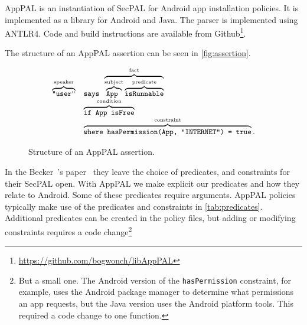 \documentclass[]{llncs}
\begin{document}
AppPAL is an instantiation of SecPAL for Android app installation policies.
It is implemented as a library for Android and Java.
The parser is implemented using ANTLR4.
Code and build instructions are available from Github\footnote{\url{https://github.com/bogwonch/libAppPAL}}.

The structure of an AppPAL assertion can be seen in \autoref{fig:assertion}.

\begin{figure}
  \centering
  \begin{equation*}\small
    \begin{array}{r l}
      \overbrace{\text{\ttfamily "user"}}^{\text{speaker}} &
      \text{\ttfamily says }\overbrace{\overbrace{\text{\ttfamily App }}^{\text{subject}}\overbrace{\text{\ttfamily isRunnable}}^{\text{predicate}}}^{\text{fact}} \\
      & \overbrace{\text{\ttfamily if App isFree}}^{\text{condition}} \\
      & \overbrace{\text{\ttfamily where hasPermission(App, "INTERNET") = true}}^{\text{constraint}}.
    \end{array}
  \end{equation*}
  \caption{Structure of an AppPAL assertion.}
\label{fig:assertion}
\end{figure}

In the Becker~\etal's paper~\cite{Becker:2006vh} they leave the choice of
predicates, and constraints for their SecPAL open.  With AppPAL we make
explicit our predicates and how they relate to Android.  Some of these
predicates require arguments.  AppPAL policies typically make use of the
predicates and constraints in \autoref{tab:predicates}.  Additional predicates
can be created in the policy files, but adding or modifying constraints
requires a code change\footnote{But a small one.  The Android version of the
\texttt{hasPermission} constraint, for example, uses the Android package
manager to determine what permissions an app requests, but the Java version
uses the Android platform tools.  This required a code change to one function.}
\end{document}
